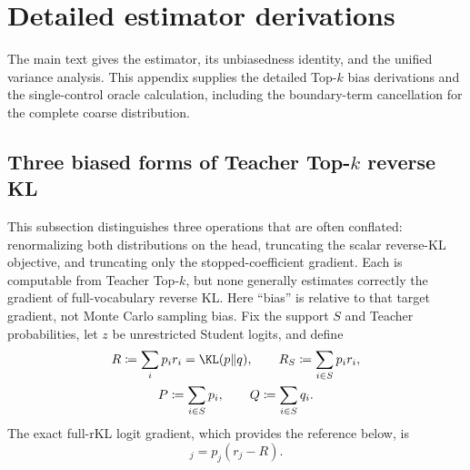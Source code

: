 \appendix
\section{Detailed estimator derivations}
\label{app:theory}

The main text gives the estimator, its unbiasedness identity, and the unified
variance analysis. This appendix supplies the detailed Top-$k$ bias
derivations and the single-control oracle calculation, including the
boundary-term cancellation for the complete coarse distribution.

\subsection{Three biased forms of Teacher \texorpdfstring{Top-$k$}{Top-k} reverse KL}
\label{app:topk-bias}

This subsection distinguishes three operations that are often conflated:
renormalizing both distributions on the head, truncating the scalar reverse-KL objective, and truncating only the stopped-coefficient gradient. Each is
computable from Teacher Top-$k$, but none generally estimates correctly the gradient of full-vocabulary reverse KL. Here ``bias'' is relative to that target gradient, not Monte Carlo sampling bias. Fix the support $S$ and Teacher probabilities,
let $z$ be unrestricted Student logits, and define
\begin{equation}
 \begin{gathered}
 R\coloneqq\sum_i p_i r_i=\KL(p\|q),\qquad
 R_S\coloneqq\sum_{i\in S}p_i r_i,\\
 P\coloneqq\sum_{i\in S}p_i,\qquad
 Q\coloneqq\sum_{i\in S}q_i.
 \end{gathered}
\end{equation}
The exact full-rKL logit gradient, which provides the reference below, is
\begin{equation}
 [\nabla_z R]_j=p_j(r_j-R).
 \label{eq:full-rkl-logit-gradient}
\end{equation}


